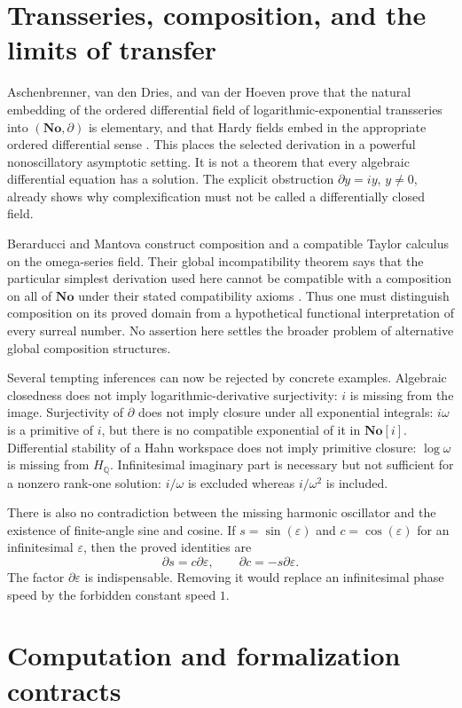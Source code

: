 \documentclass[11pt,a4paper]{article}
\theoremstyle{definition}
\newcommand{\No}{\mathbf{No}}
\newcommand{\SC}{\mathbf{No}[i]}
\newcommand{\Q}{\mathbb Q}
\newcommand{\D}{\partial}
\numberwithin{equation}{section}
\begin{document}
\section{Transseries, composition, and the limits of transfer}
\label{sec:transfer}

Aschenbrenner, van den Dries, and van der Hoeven prove that the natural
embedding of the ordered differential field of logarithmic-exponential
transseries into $(\No,\D)$ is elementary, and that Hardy fields embed
in the appropriate ordered differential sense \cite{ADH}. This places the
selected derivation in a powerful nonoscillatory asymptotic setting. It is
not a theorem that every algebraic differential equation has a solution.
The explicit obstruction $\D y=iy$, $y\ne0$, already shows why
complexification must not be called a differentially closed field.

Berarducci and Mantova construct composition and a compatible Taylor
calculus on the omega-series field. Their global incompatibility theorem
says that the particular simplest derivation used here cannot be
compatible with a composition on all of $\No$ under their stated
compatibility axioms \cite{BMComposition}. Thus one must distinguish
composition on its proved domain from a hypothetical functional
interpretation of every surreal number. No assertion here settles the
broader problem of alternative global composition structures.

Several tempting inferences can now be rejected by concrete examples.
Algebraic closedness does not imply logarithmic-derivative surjectivity:
$i$ is missing from the image. Surjectivity of $\D$ does not imply
closure under all exponential integrals: $i\omega$ is a primitive of $i$,
but there is no compatible exponential of it in $\SC$. Differential
stability of a Hahn workspace does not imply primitive closure:
$\log\omega$ is missing from $H_\Q$. Infinitesimal imaginary part is
necessary but not sufficient for a nonzero rank-one solution:
$i/\omega$ is excluded whereas $i/\omega^2$ is included.

There is also no contradiction between the missing harmonic oscillator
and the existence of finite-angle sine and cosine. If
$s=\sin(\varepsilon)$ and $c=\cos(\varepsilon)$ for an infinitesimal
$\varepsilon$, then the proved identities are
\[
 \D s=c\D\varepsilon,\qquad
 \D c=-s\D\varepsilon.
\]
The factor $\D\varepsilon$ is indispensable. Removing it would replace
an infinitesimal phase speed by the forbidden constant speed $1$.

\section{Computation and formalization contracts}\label{sec:computation}
\end{document}
